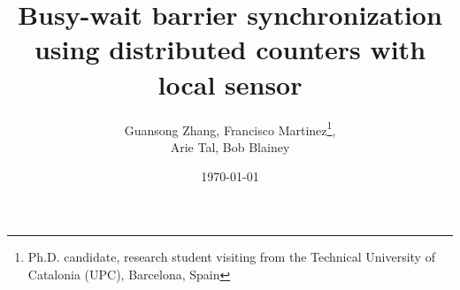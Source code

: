 
\date{\today}      %

\title{Busy-wait barrier synchronization using distributed counters with local sensor}

\author{Guansong Zhang, 
Francisco Martinez\thanks{Ph.D. candidate, research student visiting from the Technical University of Catalonia (UPC), Barcelona, Spain},\\ 
Arie Tal, Bob Blainey} 


\maketitle

\thispagestyle{empty}
